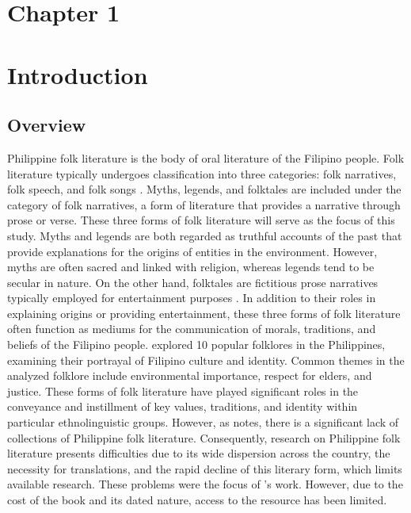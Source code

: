     \section*{Chapter 1 }
\label{sec:researchdesc}    %
\section{Introduction}
\subsection{Overview}
\label{subsec:overview}
    Philippine folk literature is the body of oral literature of the Filipino people. Folk literature typically undergoes classification into three categories: folk narratives, folk speech, and folk songs \cite{eugenio2007philippine}. Myths, legends, and folktales are included under the category of folk narratives, a form of literature that provides a narrative through prose or verse. These three forms of folk literature will serve as the focus of this study. Myths and legends are both regarded as truthful accounts of the past that provide explanations for the origins of entities in the environment. However, myths are often sacred and linked with religion, whereas legends tend to be secular in nature. On the other hand, folktales are fictitious prose narratives typically employed for entertainment purposes \cite{eugenio2007philippine}. In addition to their roles in explaining origins or providing entertainment, these three forms of folk literature often function as mediums for the communication of morals, traditions, and beliefs of the Filipino people.  explored 10 popular folklores in the Philippines, examining their portrayal of Filipino culture and identity. Common themes in the analyzed folklore include environmental importance, respect for elders, and justice. These forms of folk literature have played significant roles in the conveyance and instillment of key values, traditions, and identity within particular ethnolinguistic groups. However, as  notes, there is a significant lack of collections of Philippine folk literature. Consequently, research on Philippine folk literature presents difficulties due to its wide dispersion across the country, the necessity for translations, and the rapid decline of this literary form, which limits available research. These problems were the focus of ’s work. However, due to the cost of the book and its dated nature, access to the resource has been limited. 

